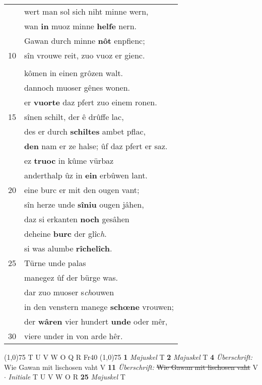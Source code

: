 \documentclass[8pt,a4paper,notitlepage]{article}
\begin{document}
\begin{table}[ht]
\begin{minipage}[t]{0.5\linewidth}
\begin{tabular}{rl}
 & wert man sol sich niht minne wern,\\ 
 & wan \textbf{in} muoz minne \textbf{helfe} nern.\\ 
 & Gawan durch minne \textbf{nôt} enpfienc;\\ 
10 & sîn vrouwe reit, zuo vuoz er gienc.\\ 
 & \textit{\begin{large}O\end{large}}rgeluse unde der degen balt\\ 
 & kômen in einen grôzen walt.\\ 
 & dannoch muoser gênes wonen.\\ 
 & er \textbf{vuorte} daz pfert zuo einem ronen.\\ 
15 & sînen schilt, der ê drûffe lac,\\ 
 & des er durch \textbf{schiltes} ambet pflac,\\ 
 & \textbf{den} nam er ze halse; ûf daz pfert er saz.\\ 
 & ez \textbf{truoc} in kûme vürbaz\\ 
 & anderthalp ûz in \textbf{ein} erbûwen lant.\\ 
20 & eine burc er mit den ougen vant;\\ 
 & sîn herze unde \textbf{sîniu} ougen jâhen,\\ 
 & daz si erkanten \textbf{noch} gesâhen\\ 
 & deheine \textbf{burc} der glîc\textit{h}.\\ 
 & si was alumbe \textbf{rîchelîch}.\\ 
25 & Türne unde palas\\ 
 & manegez ûf der bürge was.\\ 
 & dar zuo muoser s\textit{ch}ouwen\\ 
 & in den venstern manege \textbf{schœne} vrouwen;\\ 
 & der \textbf{wâren} vier hundert \textbf{unde} oder mêr,\\ 
30 & viere under in von arde hêr.\\ 
\end{tabular}
\scriptsize
\line(1,0){75} \newline
T U V W O Q R Fr40 \newline
\line(1,0){75} \newline
\textbf{1} \textit{Majuskel} T  \textbf{2} \textit{Majuskel} T  \textbf{4} \textit{Überschrift:} Wie Gawan mit lischosen vaht V  \textbf{11} \textit{Überschrift:} \sout{Wie Gawan mit lischosen vaht} V   $\cdot$ \textit{Initiale} T U V W O R  \textbf{25} \textit{Majuskel} T  \newline

\end{minipage}
\end{table}
\end{document}
